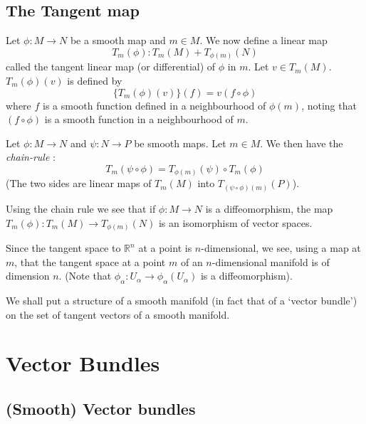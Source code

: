 \subsection*{The Tangent map}
\pageoriginale

Let $\phi:M\to N$ be a smooth map and $m\in M$. We now define a linear map
$$
T_{m}(\phi):T_{m}(M)+T_{\phi(m)}(N)
$$
called the tangent linear map (or differential) of $\phi$ in $m$. Let $v\in T_{m}(M)$. $T_{m}(\phi)(v)$ is defined by
$$
\{T_{m}(\phi)(v)\}(f)=v(f\circ \phi)
$$
where $f$ is a smooth function defined in a neighbourhood of $\phi(m)$, noting that $(f\circ \phi)$ is a smooth function in a neighbourhood of $m$. 

Let $\phi:M\to N$ and $\psi:N\to P$ be smooth maps. Let $m\in M$. We then have the {\em chain-rule} :
$$
T_{m}(\psi\circ \phi)=T_{\phi(m)}(\psi)\circ T_{m}(\phi)
$$
(The two sides are linear maps of $T_{m}(M)$ into $T_{(\psi\circ\phi)(m)}(P)$).

Using the chain rule we see that if $\phi:M\to N$ is a diffeomorphism, the map $T_{m}(\phi):T_{m}(M)\to T_{\phi(m)}(N)$ is an isomorphism of vector spaces.

Since the tangent space to $\mathbb{R}^{n}$ at a point is $n$-dimensional, we see, using a map at $m$, that the tangent space at a point $m$ of an $n$-dimensional manifold is of dimension $n$. (Note that $\phi_{\alpha}:U_{\alpha}\to \phi_{\alpha}(U_{\alpha})$ is a diffeomorphism).

We shall put a structure of a smooth manifold (in fact that of a `vector bundle') on the set of tangent vectors of a smooth manifold.

\section{Vector Bundles}\label{sec2}

\subsection*{(Smooth) Vector bundles}
\pageoriginale

